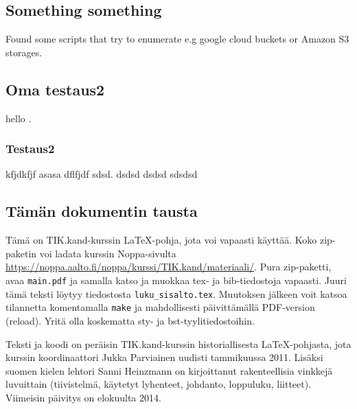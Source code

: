 \subsection{Something something}

Found some scripts that try to enumerate e.g google cloud buckets or Amazon S3 storages.

\subsection{Oma testaus2}

hello \cite{hackers_guide}.

\subsubsection{Testaus2}

kfjdkfjf \cite{dns_responsiveness} asasa dflfjdf \cite{dns_belongs_to_us} sdsd.
\cite{counting_in_the_dark} dsdsd
\cite{ipv6_discovery} dsdsd
\cite{service_discovery} sdsdsd

\subsection{Tämän dokumentin tausta}

\begin{sloppypar}
  Tämä on TIK.kand-kurssin \LaTeX{}-pohja, jota voi vapaasti
  käyttää. Koko zip-paketin voi ladata kurssin Noppa-sivulta
  \url{https://noppa.aalto.fi/noppa/kurssi/TIK.kand/materiaali/}.
  Pura zip-paketti, avaa \verb!main.pdf! ja samalla katso ja muokkaa
  tex- ja bib-tiedostoja vapaasti. Juuri tämä teksti löytyy
  tiedostosta \verb!luku_sisalto.tex!. Muutoksen jälkeen voit katsoa
  tilannetta komentamalla \verb!make! ja mahdollisesti päivittämällä
  PDF-version (reload). Yritä olla koskematta sty- ja
  bst-tyylitiedostoihin. 
\end{sloppypar}

Teksti ja koodi on peräisin TIK.kand-kurssin historiallisesta
\LaTeX{}-pohjasta, jota kurssin koordinaattori Jukka Parviainen
uudisti tammikuussa 2011.  Lisäksi suomen kielen lehtori Sanni
Heinzmann on kirjoittanut rakenteellisia vinkkejä luvuittain
(tiivistelmä, käytetyt lyhenteet, johdanto, loppuluku, liitteet).
Viimeisin päivitys on elokuulta 2014.

